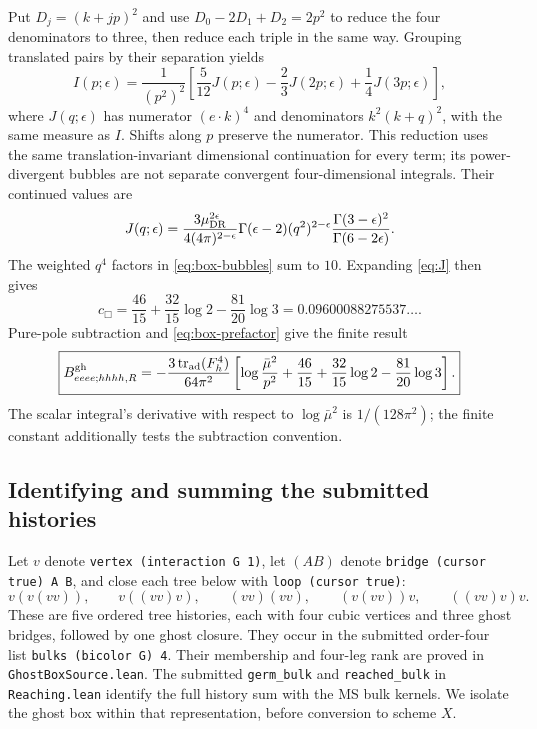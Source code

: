 \documentclass[11pt]{article}
\newcommand{\tr}{\operatorname{tr}}
\newcommand{\ad}{\operatorname{ad}}
\newcommand{\code}[1]{{\small\nolinkurl{#1}}}
\begin{document}
Put $D_j=(k+jp)^2$ and use $D_0-2D_1+D_2=2p^2$ to reduce the four
denominators to three, then reduce each triple in the same way. Grouping
translated pairs by their separation yields
\begin{equation}\label{eq:box-bubbles}
 I(p;\epsilon)=\frac1{(p^2)^2}
 \left[\frac5{12}J(p;\epsilon)-\frac23J(2p;\epsilon)
 +\frac14J(3p;\epsilon)\right],
\end{equation}
where $J(q;\epsilon)$ has numerator $(e\cdot k)^4$ and denominators
$k^2(k+q)^2$, with the same measure as $I$. Shifts along $p$ preserve the
numerator. This reduction uses the same translation-invariant dimensional
continuation for every term; its power-divergent bubbles are not separate
convergent four-dimensional integrals. Their continued values are
\begin{equation}\label{eq:J}
 J(q;\epsilon)=\frac{3\mu_{\rm DR}^{2\epsilon}}{4(4\pi)^{2-\epsilon}}
 \Gamma(\epsilon-2)(q^2)^{2-\epsilon}
 \frac{\Gamma(3-\epsilon)^2}{\Gamma(6-2\epsilon)}.
\end{equation}
The weighted $q^4$ factors in \eqref{eq:box-bubbles} sum to $10$.
Expanding \eqref{eq:J} then gives
\begin{equation}\label{eq:cbox}
 \boxed{c_\Box=\frac{46}{15}+\frac{32}{15}\log2-\frac{81}{20}\log3
 =0.09600088275537\ldots.}
\end{equation}
Pure-pole subtraction and \eqref{eq:box-prefactor} give the finite result
\begin{equation}\label{eq:box-answer}
 \boxed{B^{\rm gh}_{eeee;hhhh,R}
 =-\frac{3\tr_{\ad}(F_h^4)}{64\pi^2}
 \left[\log\frac{\bar\mu^2}{p^2}
 +\frac{46}{15}+\frac{32}{15}\log2-\frac{81}{20}\log3\right].}
\end{equation}
The scalar integral's derivative with respect to $\log\bar\mu^2$ is
$1/(128\pi^2)$; the finite constant additionally tests the subtraction
convention.

\subsection{Identifying and summing the submitted histories}

Let $v$ denote \code{vertex (interaction G 1)}, let $(AB)$ denote
\code{bridge (cursor true) A B}, and close each tree below with
\code{loop (cursor true)}:
\[
 v(v(vv)),\qquad v((vv)v),\qquad (vv)(vv),\qquad
 (v(vv))v,\qquad ((vv)v)v.
\]
These are five ordered tree histories, each with four cubic vertices and
three ghost bridges, followed by one ghost closure. They occur in the
submitted order-four list \code{bulks (bicolor G) 4}. Their membership and
four-leg rank are proved in \code{GhostBoxSource.lean}.
The submitted \code{germ_bulk} and \code{reached_bulk} in
\code{Reaching.lean} identify the full history sum with the MS bulk kernels. We isolate the ghost box
within that representation, before conversion to scheme $X$.
\end{document}
